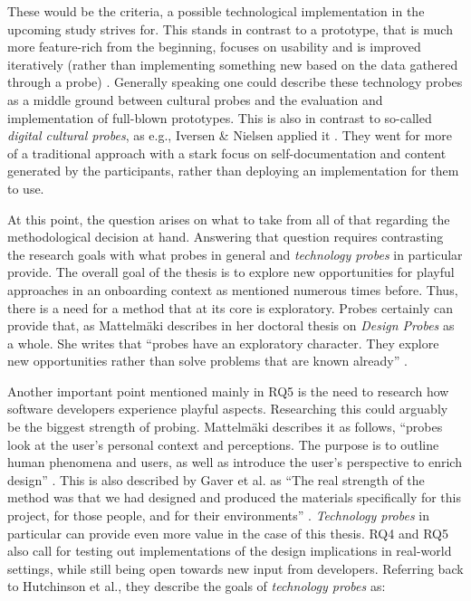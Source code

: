 These would be the criteria, a possible technological implementation in the upcoming study strives for. This stands in contrast to a prototype, that is much more feature-rich from the beginning, focuses on usability and is improved iteratively (rather than implementing something new based on the data gathered through a probe) \cite[p. 18-19]{hutchinson2003technology}. Generally speaking one could describe these technology probes as a middle ground between cultural probes and the evaluation and implementation of full-blown prototypes. This is also in contrast to so-called \textit{digital cultural probes}, as e.g., Iversen \& Nielsen applied it \cite{iversen2003using}. They went for more of a traditional approach with a stark focus on self-documentation and content generated by the participants, rather than deploying an implementation for them to use.

At this point, the question arises on what to take from all of that regarding the methodological decision at hand. Answering that question requires contrasting the research goals with what probes in general and \textit{technology probes} in particular provide. The overall goal of the thesis is to explore new opportunities for playful approaches in an onboarding context as mentioned numerous times before. Thus, there is a need for a method that at its core is exploratory. Probes certainly can provide that, as Mattelmäki describes in her doctoral thesis on \textit{Design Probes} as a whole. She writes that \enquote{probes have an exploratory character. They explore new opportunities rather than solve problems that are known already} \cite[p. 40]{mattelmaki2006design}.

Another important point mentioned mainly in RQ5 is the need to research how software developers experience playful aspects. Researching this could arguably be the biggest strength of probing. Mattelmäki describes it as follows, \enquote{probes look at the user’s personal context and perceptions. The purpose is to outline human phenomena and users, as well as introduce the user’s perspective to enrich design} \cite[p. 40]{mattelmaki2006design}. This is also described by Gaver et al. as \enquote{The real strength of the method was that we had designed and produced the materials specifically for this project, for those people, and for their environments} \cite[p. 29]{gaver1999design}. \textit{Technology probes} in particular can provide even more value in the case of this thesis. RQ4 and RQ5 also call for testing out implementations of the design implications in real-world settings, while still being open towards new input from developers. Referring back to Hutchinson et al., they describe the goals of \textit{technology probes} as:

